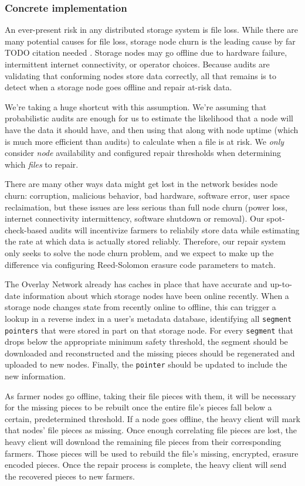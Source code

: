 \documentclass[a4paper,10pt]{article} \usepackage[utf8]{inputenc}
\newcommand{\x}[1]{{\tt #1}} \newcommand{\code}[1]{{\tt #1}}
\newcommand{\todo}[1]{{\color{red} TODO #1 }}
\begin{document}
\subsubsection{Concrete implementation}

An ever-present risk in any distributed storage system is file loss. While there
are many potential causes for file loss, storage node churn is the leading
cause by far \todo{citation needed}. Storage nodes may go offline due to
hardware failure, intermittent internet connectivity, or operator choices.
Because audits are validating that conforming nodes store data correctly, all
that remains is to detect when a storage node goes offline and repair at-risk
data.

We're taking a huge shortcut with this assumption. We're assuming that
probabilistic audits are enough for us to estimate the likelihood that a node
will have the data it should have, and then using that along with node uptime
(which is much more efficient than audits) to calculate when a file is at risk.
We {\em only} consider {\em node} availability and configured repair thresholds
when determining which {\em files} to repair.

There are many other ways data might get lost in the network besides node churn:
corruption, malicious behavior, bad hardware, software error, user space
reclaimation, but these issues are less serious than full node churn (power
loss, internet connectivity intermittency, software shutdown or removal).
Our spot-check-based audits will incentivize farmers to reliabily store data
while estimating the rate at which data is actually stored reliably.
Therefore, our repair system only seeks to solve the node churn problem, and
we expect to make up the difference via configuring Reed-Solomon erasure code
parameters to match.

The Overlay Network already has caches in place that have accurate and
up-to-date information about which storage nodes have been online recently.
When a storage node changes state from recently online to offline, this can
trigger a lookup in a reverse index in a user's metadata database, identifying
all \x{segment} \x{pointers} that were stored in part on that storage node.
For every \x{segment} that drops below the appropriate minimum safety
threshold, the segment should be downloaded and reconstructed and the missing
pieces should be regenerated and uploaded to new nodes. Finally, the
\x{pointer} should be updated to include the new information.

As farmer nodes go offline, taking their file pieces with them, it will be
necessary for the missing pieces to be rebuilt once the entire file's pieces
fall below a certain, predetermined threshold. If a node goes offline, the
heavy client will mark that nodes' file pieces as missing. Once enough
correlating file pieces are lost, the heavy client will download the
remaining file pieces from their corresponding farmers. Those pieces will
be used to rebuild the file's missing, encrypted, erasure encoded pieces.
Once the repair process is complete, the heavy client will send the
recovered pieces to new farmers.
\end{document}

